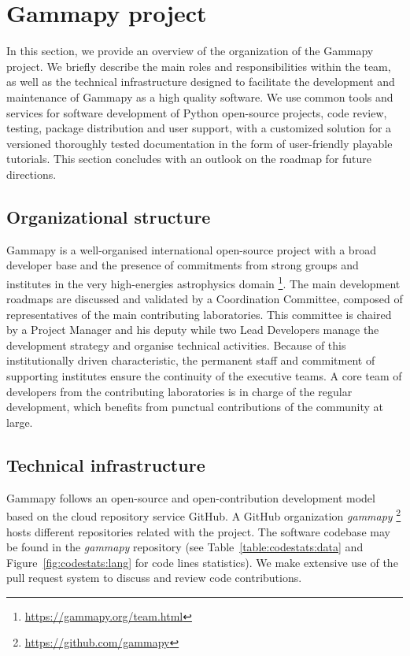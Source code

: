 \section{Gammapy project}
\label{sec:gammapy-project}

In this section, we provide an overview of the organization of the Gammapy project. We briefly describe the main roles and responsibilities within the team, as well as the technical infrastructure designed to facilitate the development and maintenance of Gammapy as a high quality software. We use common tools and services for software development of Python open-source projects, code review, testing, package distribution and user support, with a customized solution for a versioned thoroughly tested documentation in the form of user-friendly playable tutorials. This section concludes with an outlook on the roadmap for future directions.

\subsection{Organizational structure}
\label{ssec:organizational-structure}

Gammapy is a well-organised international open-source project with a broad developer base and the presence of commitments from strong groups and institutes in the very high-energies astrophysics domain \footnote{\url{https://gammapy.org/team.html}}. The main development roadmaps are discussed and validated by a Coordination Committee, composed of representatives of the main contributing laboratories. This committee is chaired by a Project Manager and his deputy while two Lead Developers manage the development strategy and organise technical activities. Because of this institutionally driven characteristic, the permanent staff and commitment of supporting institutes ensure the continuity of the executive teams. A core team of developers from the contributing laboratories is in charge of the regular development, which benefits from punctual contributions of the community at large.

\subsection{Technical infrastructure}
\label{ssec:technical-infrastructure}

Gammapy follows an open-source and open-contribution development model based on the cloud repository service GitHub. A GitHub organization \textit{gammapy} \footnote{\url{https://github.com/gammapy}} hosts different repositories related with the project. The software codebase may be found in the \textit{gammapy} repository (see Table~\ref{table:codestats:data} and Figure~\ref{fig:codestats:lang} for code lines statistics). We make extensive use of the pull request system to discuss and review code contributions.

